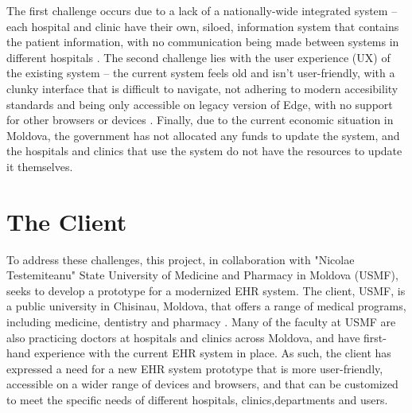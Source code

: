 \noindent The first challenge occurs due to a lack of a nationally-wide integrated system -- each hospital and clinic have their own, siloed, information system that contains the patient information, with no communication being made between systems in different hospitals \parencite{mdehr}. The second challenge lies with the user experience (UX) of the existing system -- the current system feels old and isn't user-friendly, with a clunky interface that is difficult to navigate, not adhering to modern accesibility standards and being only accessible on legacy version of Edge, with no support for other browsers or devices \parencite{mdehr}. Finally, due to the current economic situation in Moldova, the government has not allocated any funds to update the system, and the hospitals and clinics that use the system do not have the resources to update it themselves. 

\section{The Client}

\noindent To address these challenges, this project, in collaboration with "Nicolae Testemiteanu" State University of Medicine and Pharmacy in Moldova (USMF), seeks to develop a prototype for a modernized EHR system. The client, USMF, is a public university in Chisinau, Moldova, that offers a range of medical programs, including medicine, dentistry and pharmacy \parencite{mduni}. Many of the faculty at USMF are also practicing doctors at hospitals and clinics across Moldova, and have first-hand experience with the current EHR system in place. As such, the client has expressed a need for a new EHR system prototype that is more user-friendly, accessible on a wider range of devices and browsers, and that can be customized to meet the specific needs of different hospitals, clinics,departments and users.
